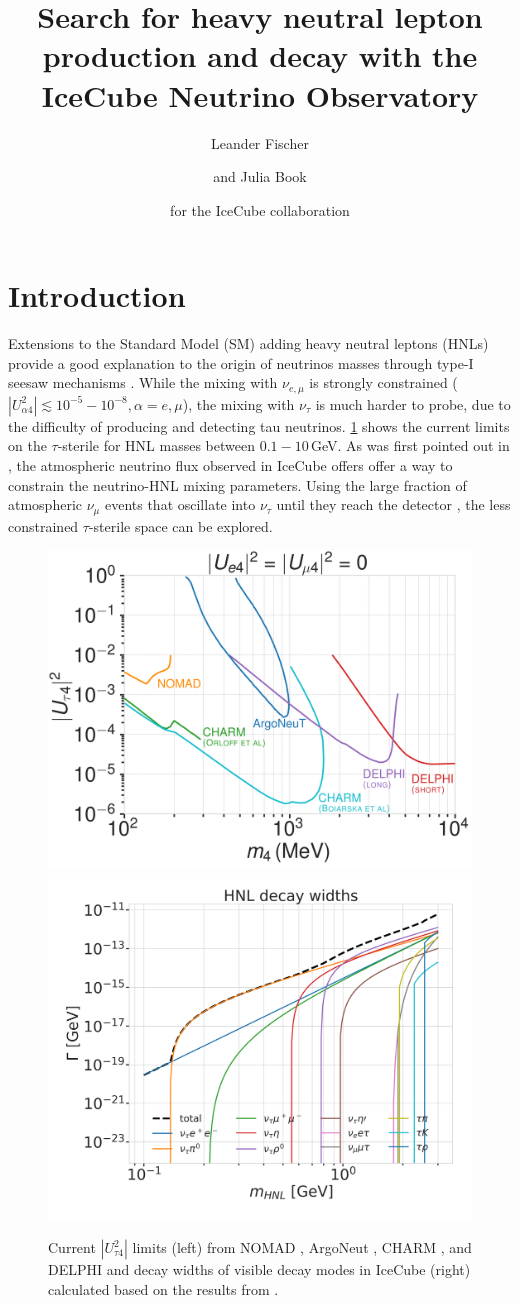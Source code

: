 \documentclass[a4paper,11pt]{article}
\title{Search for heavy neutral lepton production and decay with the IceCube Neutrino Observatory}
\author*[a]{Leander Fischer}
\author[b]{and Julia Book}
\author{for the IceCube collaboration}
\affiliation[a]{DESY, D-15738 Zeuthen, Germany}
\affiliation[b]{Harvard University, Cambridge, MA 02138, USA}
\begin{document}
\maketitle


\section{Introduction}


Extensions to the Standard Model (SM) adding heavy neutral leptons (HNLs) provide a good explanation to the origin of neutrinos masses through type-I seesaw mechanisms \cite{10.1143/PTP.64.1103}. While the mixing with $\nu_{e,\mu}$ is strongly constrained ($|U_{\alpha4}^2| \lesssim 10^{-5}-10^{-8}, \alpha=e,\mu$), the mixing with $\nu_{\tau}$ is much harder to probe, due to the difficulty of producing and detecting tau neutrinos. \cref{fig:hnl_limits_and_decay_widths} shows the current limits on the $\tau$-sterile for HNL masses between $0.1-10\,$GeV. As was first pointed out in \cite{Coloma:2017ppo}, the atmospheric neutrino flux observed in IceCube offers offer a way to constrain the neutrino-HNL mixing parameters. Using the large fraction of atmospheric $\nu_{\mu}$ events that oscillate into $\nu_{\tau}$ until they reach the detector \cite{IceCube:2019dqi}, the less constrained $\tau$-sterile space can be explored.



\begin{figure}[h]
  \includegraphics[width=.50\linewidth]{figures/UtauN_custom_plots_LF_grid_white.png}
  \includegraphics[width=.47\linewidth]{figures/hnl_decay_widths_log.png}
  \label{fig:hnl_visible_decay_widths}
  \caption{Current $|U_{\tau4}^2|$ limits (left) from NOMAD \cite{NOMAD:2001eyx}, ArgoNeut \cite{ArgoNeuT:2021clc}, CHARM \cite{Orloff:2002de, Boiarska:2021yho}, and DELPHI \cite{DELPHI:1996qcc} and decay widths of visible decay modes in IceCube (right) calculated based on the results from \cite{Gorbunov:2007ak}.}
  \label{fig:hnl_limits_and_decay_widths}
\end{figure}
\end{document}
